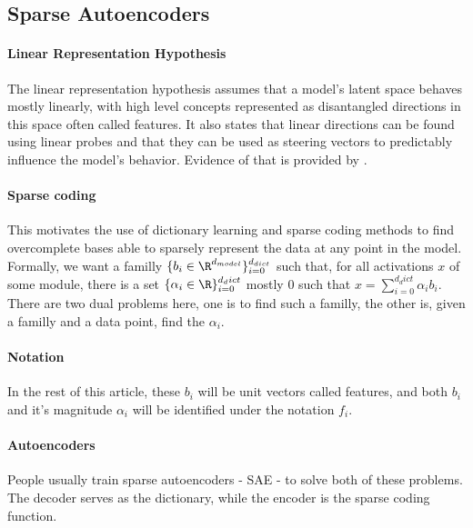 \documentclass{article}
\begin{document}
\subsection{Sparse Autoencoders}
\label{sec:SAE}

\paragraph{Linear Representation Hypothesis} The linear representation hypothesis assumes that a model's latent space behaves mostly linearly, with high level concepts represented as disantangled directions in this space often called features. It also states that linear directions can be found using linear probes and that they can be used as steering vectors to predictably influence the model's behavior. Evidence of that is provided by \citet{park2023linear, NIPS2013_9aa42b31, pennington2014glove, nanda2023emergent, gurnee2024language, wang2024concept, turner2024activationSteering}.

\paragraph{Sparse coding} This motivates the use of dictionary learning and sparse coding methods to find overcomplete bases able to sparsely represent the data at any point in the model. Formally, we want a familly $\{b_i \in \R^{d_{model}}\}_{i=0}^{d_{dict}}$ such that, for all activations $x$ of some module, there is a set $\{\alpha_i \in \R\}_{i=0}^{d_dict}$ mostly 0 such that $x = \sum_{i=0}^{d_dict} \alpha_i b_i$. There are two dual problems here, one is to find such a familly, the other is, given a familly and a data point, find the $\alpha_i$.

\paragraph{Notation} In the rest of this article, these $b_i$ will be unit vectors called features, and both $b_i$ and it's magnitude $\alpha_i$ will be identified under the notation $f_i$.

\paragraph{Autoencoders} People usually train sparse autoencoders - SAE - \citep{ng2011sparse} to solve both of these problems. The decoder serves as the dictionary, while the encoder is the sparse coding function.
\end{document}
